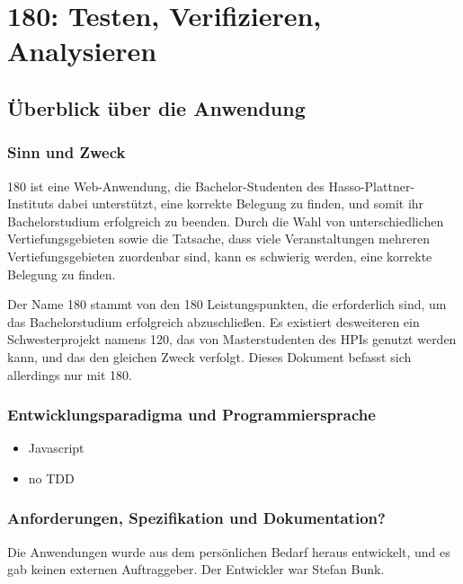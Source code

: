 \documentclass[]{article}
\author{}
\date{}
\begin{document}
\section{180: Testen, Verifizieren,
Analysieren}\label{testen-verifizieren-analysieren}

\subsection{Überblick über die
Anwendung}\label{uxfcberblick-uxfcber-die-anwendung}

\subsubsection{Sinn und Zweck}\label{sinn-und-zweck}

180 ist eine Web-Anwendung, die Bachelor-Studenten des
Hasso-Plattner-Instituts dabei unterstützt, eine korrekte Belegung zu
finden, und somit ihr Bachelorstudium erfolgreich zu beenden. Durch die
Wahl von unterschiedlichen Vertiefungsgebieten sowie die Tatsache, dass
viele Veranstaltungen mehreren Vertiefungsgebieten zuordenbar sind, kann
es schwierig werden, eine korrekte Belegung zu finden.

Der Name 180 stammt von den 180 Leistungspunkten, die erforderlich sind,
um das Bachelorstudium erfolgreich abzuschließen. Es existiert
desweiteren ein Schwesterprojekt namens 120, das von Masterstudenten des
HPIs genutzt werden kann, und das den gleichen Zweck verfolgt. Dieses
Dokument befasst sich allerdings nur mit 180.

\subsubsection{Entwicklungsparadigma und
Programmiersprache}\label{entwicklungsparadigma-und-programmiersprache}

\begin{itemize}
\itemsep1pt\parskip0pt
\item
  Javascript
\item
  no TDD
\end{itemize}

\subsubsection{Anforderungen, Spezifikation und
Dokumentation?}\label{anforderungen-spezifikation-und-dokumentation}

Die Anwendungen wurde aus dem persönlichen Bedarf heraus entwickelt, und
es gab keinen externen Auftraggeber. Der Entwickler war Stefan Bunk.
\end{document}
